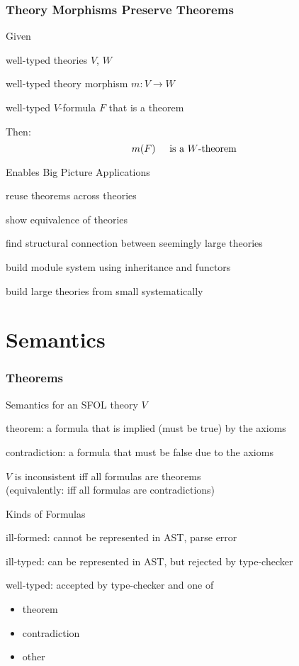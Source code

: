 \begin{frame}\frametitle{Theory Morphisms Preserve Theorems}
\begin{blockitems}{Given}
\item well-typed theories $V$, $W$
\item well-typed theory morphism $m:V\to W$
\item well-typed $V$-formula $F$ that is a theorem 
\end{blockitems}

Then:
\[m(F) \hspace*{.5cm}\text{is a } W\text{-theorem}\]

\begin{blockitems}{Enables Big Picture Applications}
\item reuse theorems across theories
\item show equivalence of theories
\item find structural connection between seemingly large theories
\item build module system using inheritance and functors
\item build large theories from small systematically
\end{blockitems}
\end{frame}


\section{Semantics}

\begin{frame}\frametitle{Theorems}
\begin{blockitems}{Semantics for an SFOL theory $V$}
\item theorem: a formula that is implied (must be true) by the axioms
\item contradiction: a formula that must be false due to the axioms
\item $V$ is inconsistent iff all formulas are theorems \\ (equivalently: iff all formulas are contradictions)
\end{blockitems}

\begin{blockitems}{Kinds of Formulas}
\item ill-formed: cannot be represented in AST, parse error
\item ill-typed: can be represented in AST, but rejected by type-checker
\item well-typed: accepted by type-checker and one of
\begin{itemize}
\item theorem
\item contradiction
\item other
\end{itemize}
\end{blockitems}
\end{frame}


